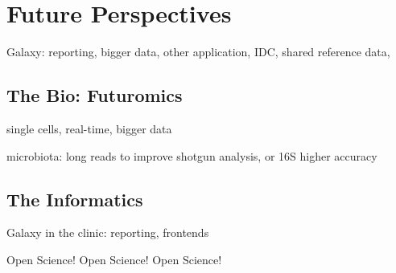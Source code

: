 \section{Future Perspectives}

Galaxy: reporting, bigger data, other application, IDC, shared reference data,

\subsection{The Bio: Futuromics}
single cells, real-time, bigger data

microbiota: long reads to improve shotgun analysis, or 16S higher accuracy

\subsection{The Informatics}

Galaxy in the clinic: reporting, frontends

Open Science! Open Science! Open Science!



